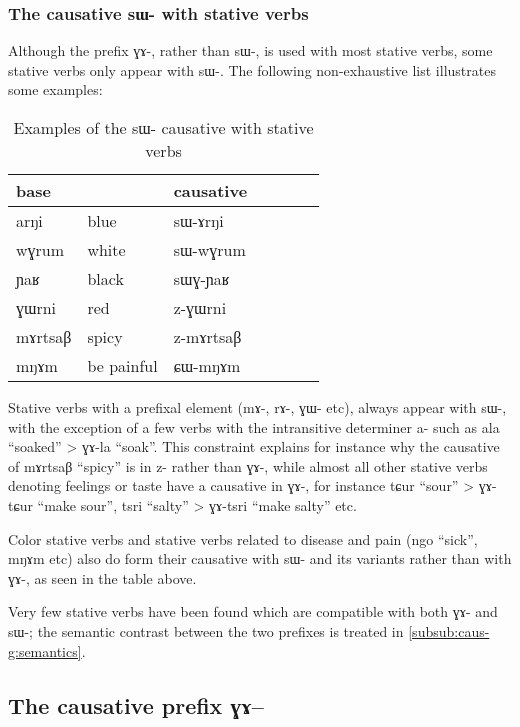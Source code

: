 \documentclass[oldfontcommands,oneside,a4paper,11pt]{article}
\newcommand{\ipa}[1]{{\phon \mbox{#1}}} %
\begin{document}
 \subsubsection{The causative \ipa{sɯ-} with stative verbs} \label{subsub:caus.sW.stative}
 Although the prefix \ipa{ɣɤ-}, rather than \ipa{sɯ-}, is used with most stative verbs, some stative verbs only appear with \ipa{sɯ-}. The following non-exhaustive list illustrates some examples:
 \begin{table}[H]
\caption{Examples of the \ipa{sɯ}- causative with stative verbs }\label{tab:causative.sW.stative} \centering
\begin{tabular}{lllllll} \toprule
  base  & &causative  \\
\midrule
   \ipa{arŋi} & blue & \ipa{sɯ-ɤrŋi} \\
 \ipa{wɣrum} & white & \ipa{sɯ-wɣrum} \\
 \ipa{ɲaʁ} & black & \ipa{sɯɣ-ɲaʁ} \\
  \ipa{ɣɯrni} & red & \ipa{z-ɣɯrni} \\
    \ipa{mɤrtsaβ} & spicy & \ipa{z-mɤrtsaβ} \\
       \ipa{mŋɤm} & be painful & \ipa{ɕɯ-mŋɤm} \\
\bottomrule
\end{tabular}
\end{table}
   
    Stative verbs with a prefixal element (\ipa{mɤ-}, \ipa{rɤ-}, \ipa{ɣɯ-} etc), always appear with \ipa{sɯ-}, with the exception of a few verbs with the intransitive determiner \ipa{a-} such as \ipa{ala}  ``soaked'' > \ipa{ɣɤ-la}  ``soak''. This constraint explains for instance why the causative of \ipa{mɤrtsaβ}  ``spicy'' is  in \ipa{z-} rather than \ipa{ɣɤ-}, while almost all other stative verbs denoting feelings or taste have a causative in \ipa{ɣɤ-}, for instance \ipa{tɕur}  ``sour'' > \ipa{ɣɤ-tɕur}  ``make   sour'',   \ipa{tsri}  ``salty'' > \ipa{ɣɤ-tsri}  ``make   salty'' etc.  
  
Color stative verbs and stative verbs related to disease and pain (\ipa{ngo} ``sick'', \ipa{mŋɤm} etc) also do  form their causative with \ipa{sɯ-} and its variants rather than with \ipa{ɣɤ-}, as seen in the table above.
  
  Very few stative verbs have been found which are compatible with both \ipa{ɣɤ-} and \ipa{sɯ-}; the semantic contrast between the two prefixes is treated in \ref{subsub:caus-g:semantics}.
 
 

\subsection{The causative prefix \ipa{ɣɤ--}} \label{sub:caus2}
\end{document}
